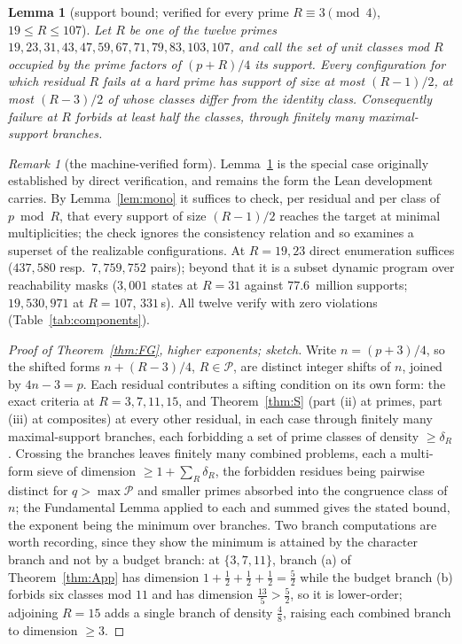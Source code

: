 \documentclass[11pt]{article}
\theoremstyle{plain}
\newtheorem{lemma}[theorem]{Lemma}
\theoremstyle{remark}
\newtheorem{remark}[theorem]{Remark}
\theoremstyle{plain}
\numberwithin{equation}{section}
\begin{document}
\begin{lemma}[support bound; verified for every prime
$R \equiv 3 \pmod 4$, $19 \le R \le 107$]\label{lem:S}
Let $R$ be one of the twelve primes
$19, 23, 31, 43, 47, 59, 67, 71, 79, 83, 103, 107$, and call the set of
unit classes mod $R$ occupied by the prime factors of $(p+R)/4$ its
\emph{support}. Every configuration for which residual $R$ fails at a
hard prime has support of size at most $(R-1)/2$, at most $(R-3)/2$ of
whose classes differ from the identity class. Consequently failure at
$R$ forbids at least half the classes, through finitely many
maximal-support branches.
\end{lemma}

\begin{remark}[the machine-verified form]\label{rem:lemS}
Lemma~\ref{lem:S} is the special case originally established by direct
verification, and remains the form the Lean development carries. By
Lemma~\ref{lem:mono} it suffices to check, per residual and per class
of $p \bmod R$, that every support of size $(R-1)/2$ reaches the
target at minimal multiplicities; the check ignores the consistency
relation and so examines a superset of the realizable configurations.
At $R = 19, 23$ direct enumeration suffices ($437{,}580$ resp.\
$7{,}759{,}752$ pairs); beyond that it is a subset dynamic program
over reachability masks ($3{,}001$ states at $R = 31$ against
$77.6$~million supports; $19{,}530{,}971$ at $R = 107$, $331$\,s).
All twelve verify with zero violations (Table~\ref{tab:components}).
\end{remark}

\begin{proof}[Proof of Theorem~\ref{thm:FG}, higher exponents; sketch]
Write $n = (p+3)/4$, so the shifted forms $n + (R-3)/4$,
$R \in \mathcal{P}$, are distinct integer shifts of $n$, joined by
$4n - 3 = p$. Each residual contributes a sifting condition on its own
form: the exact criteria at $R = 3, 7, 11, 15$, and
Theorem~\ref{thm:S} (part (ii) at primes, part (iii) at composites) at
every other residual, in each case through finitely many
maximal-support branches, each forbidding a set of prime classes of
density $\ge \delta_R$. Crossing the branches leaves finitely many
combined problems, each a multi-form sieve of dimension
$\ge 1 + \sum_R \delta_R$, the forbidden residues being pairwise
distinct for $q > \max\mathcal{P}$ and smaller primes absorbed into
the congruence class of $n$; the Fundamental Lemma applied to each and
summed gives the stated bound, the exponent being the minimum over
branches. Two branch computations are worth recording, since they
show the minimum is attained by the character branch and not by a
budget branch: at $\{3,7,11\}$, branch (a) of Theorem~\ref{thm:App}
has dimension $1 + \tfrac12 + \tfrac12 + \tfrac12 = \tfrac52$ while
the budget branch (b) forbids six classes mod $11$ and has dimension
$\tfrac{13}{5} > \tfrac52$, so it is lower-order; adjoining $R = 15$
adds a single branch of density $\tfrac48$, raising each combined
branch to dimension $\ge 3$.
\end{proof}
\end{document}
